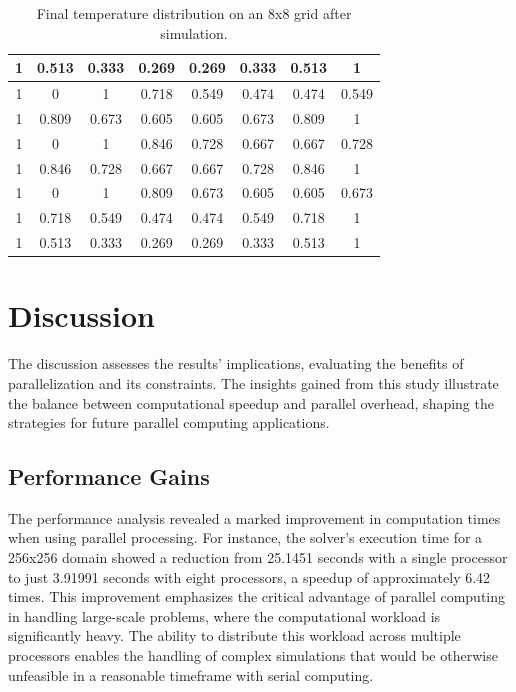 \documentclass[11pt]{article}
\begin{document}
    \begin{table}[ht]
        \centering
        \begin{tabular}{|c|c|c|c|c|c|c|c|}
            \hline
            1 & 0.513 & 0.333 & 0.269 & 0.269 & 0.333 & 0.513 & 1 \\
            \hline
            1 & 0 & 1 & 0.718 & 0.549 & 0.474 & 0.474 & 0.549 \\
            \hline
            1 & 0.809 & 0.673 & 0.605 & 0.605 & 0.673 & 0.809 & 1 \\
            \hline
            1 & 0 & 1 & 0.846 & 0.728 & 0.667 & 0.667 & 0.728 \\
            \hline
            1 & 0.846 & 0.728 & 0.667 & 0.667 & 0.728 & 0.846 & 1 \\
            \hline
            1 & 0 & 1 & 0.809 & 0.673 & 0.605 & 0.605 & 0.673 \\
            \hline
            1 & 0.718 & 0.549 & 0.474 & 0.474 & 0.549 & 0.718 & 1 \\
            \hline
            1 & 0.513 & 0.333 & 0.269 & 0.269 & 0.333 & 0.513 & 1 \\
            \hline
        \end{tabular}
        \caption{Final temperature distribution on an 8x8 grid after simulation.}
        \label{table:final_grid}
    \end{table}

    \section{Discussion}
    The discussion assesses the results' implications, evaluating the benefits of parallelization and its constraints. The insights gained from this study illustrate the balance between computational speedup and parallel overhead, shaping the strategies for future parallel computing applications.

    \subsection{Performance Gains}
    The performance analysis revealed a marked improvement in computation times when using parallel processing. For instance, the solver's execution time for a 256x256 domain showed a reduction from 25.1451 seconds with a single processor to just 3.91991 seconds with eight processors, a speedup of approximately 6.42 times. This improvement emphasizes the critical advantage of parallel computing in handling large-scale problems, where the computational workload is significantly heavy. The ability to distribute this workload across multiple processors enables the handling of complex simulations that would be otherwise unfeasible in a reasonable timeframe with serial computing.
\end{document}
